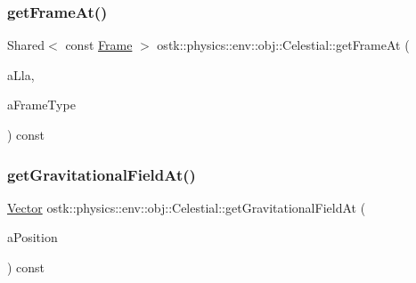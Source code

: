 \subsubsection{\texorpdfstring{get\+Frame\+At()}{getFrameAt()}}
{\footnotesize\ttfamily Shared$<$ const \hyperlink{classostk_1_1physics_1_1coord_1_1_frame}{Frame} $>$ ostk\+::physics\+::env\+::obj\+::\+Celestial\+::get\+Frame\+At (\begin{DoxyParamCaption}\item[{const \hyperlink{classostk_1_1physics_1_1coord_1_1spherical_1_1_l_l_a}{L\+LA} \&}]{a\+Lla,  }\item[{const \hyperlink{classostk_1_1physics_1_1env_1_1obj_1_1_celestial_ad005258cdc5969759c8a516fb1cfd262}{Celestial\+::\+Frame\+Type} \&}]{a\+Frame\+Type }\end{DoxyParamCaption}) const}

\mbox{\label{classostk_1_1physics_1_1env_1_1obj_1_1_celestial_adc8df9d860d30eb49600e644f63045bc}} 
\subsubsection{\texorpdfstring{get\+Gravitational\+Field\+At()}{getGravitationalFieldAt()}}
{\footnotesize\ttfamily \hyperlink{classostk_1_1physics_1_1data_1_1_vector}{Vector} ostk\+::physics\+::env\+::obj\+::\+Celestial\+::get\+Gravitational\+Field\+At (\begin{DoxyParamCaption}\item[{const \hyperlink{classostk_1_1physics_1_1coord_1_1_position}{Position} \&}]{a\+Position }\end{DoxyParamCaption}) const}

\mbox{\label{classostk_1_1physics_1_1env_1_1obj_1_1_celestial_a433a6bf852e23db369fec77f02e90647}} 
